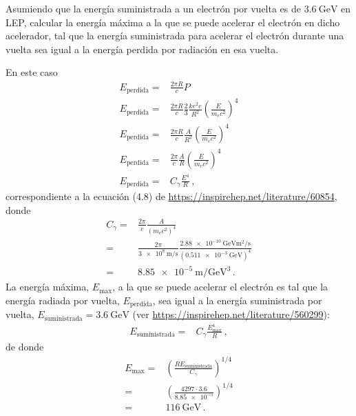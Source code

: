\documentclass[12pt, a4paper]{article}
\begin{document}
\begin{exercise}[ID=lep-max, tags={banco}]
Asumiendo que la energía suministrada a un electrón por vuelta es de $\qty{3.6}{\giga\electronvolt}$ en LEP, calcular la energía máxima a la que se puede acelerar el electrón en dicho acelerador, tal que la energía suministrada para acelerar el electrón durante una vuelta sea igual a la energía perdida por radiación en esa vuelta.
\end{exercise}
\begin{solution}
En este caso
\begin{align*}
    E_{\text{perdida}}  = &\frac{2\pi R}{c} P\\
   E_{\text{perdida}} =&\frac{2\pi R}{c} \frac{2}{3} \frac{k e^2 c}{R^2}\left(\frac{E}{m_ec^2}\right)^4\\
   E_{\text{perdida}} =&\frac{2\pi R}{c} \frac{A}{R^2}\left(\frac{E}{m_ec^2}\right)^4\\
   E_{\text{perdida}} =&\frac{2\pi}{c} \frac{A}{R}\left(\frac{E}{m_ec^2}\right)^4\\
   E_{\text{perdida}} =&C_\gamma \frac{E^4}{R}\,,
\end{align*}
correspondiente a la ecuación (4.8) de \url{https://inspirehep.net/literature/60854},
donde
\begin{align}
    C_\gamma =& \frac{2\pi}{c}\frac{A}{\left(m_e c^2\right)^4}\nonumber\\
    =& \frac{2\pi}{\qty{3e8}{\meter\per\second}}\frac{\qty{2.88e-10}{\giga\electronvolt\meter\squared\per\second}}{(\qty{0.511e-3}{\giga\electronvolt})^4}\\
    =&\qty{8.85e-5}{\meter\per\giga\electronvolt\cubed}\,.
\end{align}
La energía máxima, $E_{\text{max}}$, a la que se puede acelerar el electrón es tal que la energía radiada por vuelta, $E_{\text{perdida}}$, sea igual a la energía suministrada por vuelta, $E_{\text{suministrada}}=\qty{3.6}{\giga\electronvolt}$ (ver \url{https://inspirehep.net/literature/560299}):
\begin{align*}
    E_{\text{suministrada}} =&C_\gamma \frac{E_{\text{max}}^4}{R}\,,
\end{align*}
de donde
\begin{align*}
    E_{\text{max}} =&\left( \frac{R E_{\text{suministrada}} }{C_\gamma}\right)^{1/4}\\
    =&\left(\frac{4297\cdot 3.6}{\num{8.85e-5}}\right)^{1/4}\\
    =&\qty{116}{\giga\electronvolt}\,.
\end{align*}


\end{solution}
\end{document}
